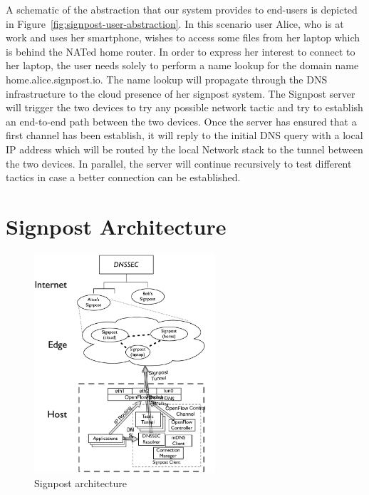A schematic of the abstraction that our system provides to end-users is depicted
in Figure~\ref{fig:signpost-user-abstraction}. In this scenario user Alice, who
is at work and uses her smartphone, wishes to access some files from her laptop
which is behind the NATed home router. In order to express her interest to
connect to her laptop, the user needs solely to perform a name lookup for the
domain name home.alice.signpost.io. The name lookup will propagate through the
DNS infrastructure to the cloud presence of her signpost system. The Signpost
server will trigger the two devices to try any possible network tactic and try
to establish an end-to-end path between the two devices. Once the server has
ensured that a first channel has been establish, it will reply to the initial
DNS query with a local IP address which will be routed by the local Network
stack to the tunnel between the two devices. In parallel, the server will
continue recursively to test different tactics in case a better connection can
be established. 


\section{Signpost Architecture}\label{sec:signpost-architecture}

\begin{figure}[ht]
  \begin{center}
	\includegraphics[width=0.6\textwidth]{signpost-arch}
  \end{center}
  \caption{Signpost architecture }
  \label{fig:signpost-arch}
\end{figure}

